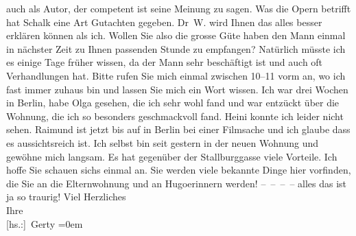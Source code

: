 {\begin{ledgroupsized}[t]{13cm}
                    auch als Autor, der competent ist seine Meinung zu sagen. Was die Opern betrifft
                    hat Schalk eine Art Gutachten gegeben.
                        Dr W. wird Ihnen das alles besser
                    erklären können als ich. Wollen Sie also die grosse Güte haben den Mann einmal
                    in nächster Zeit zu \label{T_L02535_1v}\label{T_L02535_1h} Ihnen passenden Stunde zu empfangen?
                    Natürlich müsste ich es einige Tage früher wissen, da der Mann sehr beschäftigt ist und auch oft Verhandlungen hat.
                    Bitte rufen Sie mich einmal zwischen 10–11 vorm an, wo ich fast
                    immer zuhaus bin und lassen Sie mich ein Wort wissen.\pend
           \pstart
           Ich war drei Wochen in Berlin, habe Olga gesehen, die ich sehr wohl fand und war
                    entzückt über die Wohnung, die ich so besonders geschmackvoll fand. Heini konnte ich leider nicht sehen. Raimund ist jetzt bis auf \label{T_L02535_2v}\label{T_L02535_2h} in Berlin bei einer Filmsache und ich glaube dass
                    es aussichtsreich ist. Ich selbst bin seit gestern in der neuen Wohnung und
                    gewöhne mich langsam. Es hat gegenüber der Stallburggasse viele Vorteile.\pend
           \pstart
           Ich hoffe Sie schauen sichs einmal an. Sie werden viele bekannte Dinge hier
                    vorfinden, die Sie an die Elternwohnung und an Hugoerinnern werden! – – – – alles das
                    ist ja so traurig!\pend
           \pstart
           Viel Herzliches{\\[\baselineskip]}Ihre{\\[\baselineskip]}\spacefill\mbox{{[}hs.:{]} Gerty}\pend
           \leftskip=0em{}
         

\end{ledgroupsized}}
